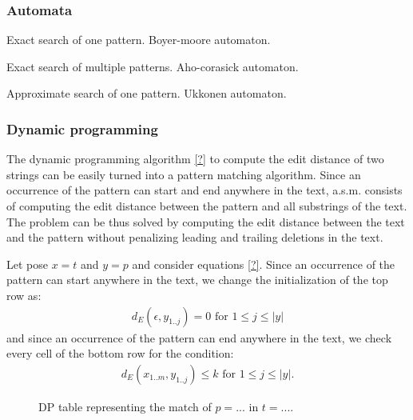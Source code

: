 \subsubsection{Automata}

Exact search of one pattern. Boyer-moore automaton.

Exact search of multiple patterns. Aho-corasick automaton.

Approximate search of one pattern. Ukkonen automaton.


\subsubsection{Dynamic programming}

The dynamic programming algorithm \ref{?} to compute the edit distance of two strings can be easily turned into a pattern matching algorithm.
Since an occurrence of the pattern can start and end anywhere in the text, a.s.m. consists of computing the edit distance between the pattern and all substrings of the text.
The problem can be thus solved by computing the edit distance between the text and the pattern without penalizing leading and trailing deletions in the text.

Let pose $x=t$ and $y=p$ and consider equations \ref{?}.
Since an occurrence of the pattern can start anywhere in the text, we change the initialization of the top row as:
\begin{eqnarray}
d_E(\epsilon, y_{1..j}) = 0 \text{ for } 1 \leq j \leq | y |
\end{eqnarray}
and since an occurrence of the pattern can end anywhere in the text, we check every cell of the bottom row for the condition:
\begin{eqnarray}
d_E(x_{1..m},y_{1..j}) \leq k \text{ for } 1 \leq j \leq | y |.
\end{eqnarray}

\begin{figure}[h]
\caption{DP table representing the match of $p=...$ in $t=...$.}
\label{fig:asm-dp}
\end{figure}




